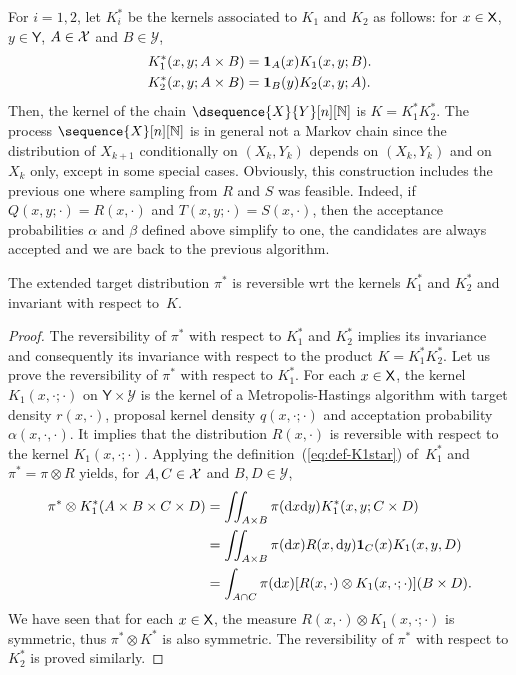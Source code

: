 \documentclass[english,graybox,envcountchap,envcountsame,sectrefs,shortlabels]{svmono}
\theoremstyle{style}
\newcommand{\Yset}{\mathsf{Y}}
\newcommand{\Ysigma}{\mathcal{Y}}
\newcommand{\eqsp}{}
\begin{document}
For $i=1,2$, let $K_i^*$ be the kernels associated to $K_1$ and $K_2$ as follows: for $x\in\mathsf{X}$,
$y\in\Yset$, $A\in\mathcal{X}$ and $B\in\Ysigma$,
\begin{align}
  K_1^*(x,y;A\times B) & = \indi{A}(x) K_1(x,y;B) \eqsp . \label{eq:def-K1star} \\
  K_2^*(x,y;A\times B) & = \indi{B}(y) K_2(x,y;A) \eqsp . \label{eq:def-K2star}
\end{align}
%
Then, the kernel of the chain $\dsequence{X}{Y}[n][\nset]$ is $K=K_1^*K_2^*$.  The process
$\sequence{X}[n][\nset]$ is in general not a Markov chain since the distribution of $X_{k+1}$
conditionally on $(X_k,Y_k)$ depends on $(X_k,Y_k)$ and on $X_k$ only, except in some special cases.
Obviously, this construction includes the previous one where sampling from $R$ and $S$ was
feasible. Indeed, if $Q(x,y;\cdot)=R(x,\cdot)$ and $T(x,y;\cdot)=S(x,\cdot)$, then the acceptance
probabilities $\alpha$ and $\beta$ defined above simplify to one, the candidates are always accepted
and we are back to the previous algorithm.



\begin{proposition}
  \label{prop:DA}
  The extended target distribution $\pi^*$ is reversible wrt the kernels $K_1^*$ and $K_2^*$ and
  invariant with respect to~$K$.
\end{proposition}


\begin{proof}
  The reversibility of $\pi^*$ with respect to $K_1^*$ and $K_2^*$ implies its invariance and
  consequently its invariance with respect to the product $K=K_1^*K_2^*$. Let us prove the
  reversibility of $\pi^*$ with respect to $K_1^*$. For each $x\in\mathsf{X}$, the kernel
  $K_1(x,\cdot;\cdot)$ on $\Yset\times\Ysigma$ is the kernel of a Metropolis-Hastings algorithm with
  target density $r(x,\cdot)$, proposal kernel density $q(x,\cdot;\cdot)$ and acceptation
  probability $\alpha(x,\cdot,\cdot)$. It implies that the
  distribution $R(x,\cdot)$ is reversible with respect to the kernel $K_1(x,\cdot;\cdot)$. Applying
  the definition~(\ref{eq:def-K1star}) of~$K_1^*$ and $\pi^*=\pi\otimes R$ yields, for
  $A,C\in\mathcal{X}$ and $B,D\in\Ysigma$,
  \begin{align*}
    \pi^* \otimes K_1^*(A\times B\times C\times D)
    & = \iint_{A\times B} \pi(\rmd x\rmd y) K_1^*(x,y;C\times D)  \\
    & = \iint_{A\times B} \pi(\rmd x) R(x,\rmd y) \indi{C}(x) K_1(x,y,D) \\
    & = \int_{A\cap C} \pi(\rmd x) [R(x,\cdot) \otimes K_1(x,\cdot;\cdot)] (B\times D) \eqsp .
  \end{align*}
  We have seen that for each $x\in\mathsf{X}$, the measure $R(x,\cdot) \otimes K_1(x,\cdot;\cdot) $ is
  symmetric, thus $\pi^* \otimes K^*$ is also symmetric. The reversibility of $\pi^*$ with respect
  to $K_2^*$ is proved similarly.
\end{proof}
\end{document}

